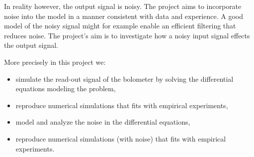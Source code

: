 
In reality however, the output signal is noisy. The project aims to incorporate noise into the model in a manner consistent with data and experience. A good model of the noisy signal might for example enable an efficient filtering that reduces noise. The project's aim is to investigate how a noisy input signal effects the output signal.

More precisely in this project we:
\begin{itemize}
 \item simulate the read-out signal of the bolometer by solving the differential equations modeling the problem,
 \item reproduce numerical simulations that fits with empirical experiments,
 \item model and analyze the noise in the differential equations,
 \item reproduce numerical simulations (with noise) that fits with empirical experiments.
\end{itemize}

